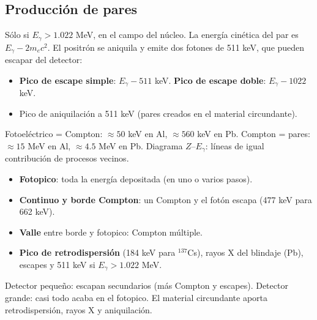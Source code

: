\subsection{Producción de pares}
Sólo si $E_\gamma>1.022$ MeV, en el campo del núcleo. La energía cinética del par es $E_\gamma-2m_ec^2$.
El positrón se aniquila y emite dos fotones de 511 keV, que pueden escapar del detector:
\begin{itemize}
\item \textbf{Pico de escape simple}: $E_\gamma-511$ keV. \textbf{Pico de escape doble}: $E_\gamma-1022$ keV.
\item Pico de aniquilación a 511 keV (pares creados en el material circundante).
\end{itemize}

\begin{dato}
Fotoeléctrico = Compton: $\approx50$ keV en Al, $\approx560$ keV en Pb. Compton = pares: $\approx15$ MeV en Al, $\approx4.5$ MeV en Pb.
Diagrama $Z$--$E_\gamma$: líneas de igual contribución de procesos vecinos.
\end{dato}

\begin{clave}
\begin{itemize}
\item \textbf{Fotopico}: toda la energía depositada (en uno o varios pasos).
\item \textbf{Continuo y borde Compton}: un Compton y el fotón escapa (477 keV para 662 keV).
\item \textbf{Valle} entre borde y fotopico: Compton múltiple.
\item \textbf{Pico de retrodispersión} (184 keV para $^{137}$Cs), rayos X del blindaje (Pb), escapes y 511 keV si $E_\gamma>1.022$ MeV.
\end{itemize}
Detector pequeño: escapan secundarios (más Compton y escapes). Detector grande: casi todo acaba en el
fotopico. El material circundante aporta retrodispersión, rayos X y aniquilación.
\end{clave}

